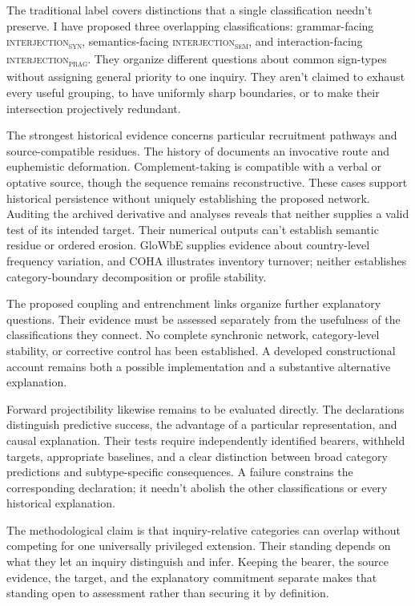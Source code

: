 \documentclass[12pt]{article}
\newcommand{\intj}[1]{\textsc{interjection\textsubscript{#1}}}
\begin{document}
The traditional label  covers distinctions that a single classification needn't preserve. I have proposed three overlapping classifications: grammar-facing \intj{syn}, semantics-facing \intj{sem}, and interaction-facing \intj{prag}. They organize different questions about common sign-types without assigning general priority to one inquiry. They aren't claimed to exhaust every useful grouping, to have uniformly sharp boundaries, or to make their intersection projectively redundant.

The strongest historical evidence concerns particular recruitment pathways and source-compatible residues. The history of  documents an invocative route and euphemistic deformation. Complement-taking  is compatible with a verbal or optative source, though the sequence remains reconstructive. These cases support historical persistence without uniquely establishing the proposed network. Auditing the archived derivative and  analyses reveals that neither supplies a valid test of its intended target. Their numerical outputs can't establish semantic residue or ordered erosion. GloWbE supplies evidence about country-level frequency variation, and COHA illustrates inventory turnover; neither establishes category-boundary decomposition or profile stability.

The proposed coupling and entrenchment links organize further explanatory questions. Their evidence must be assessed separately from the usefulness of the classifications they connect. No complete synchronic network, category-level stability, or corrective control has been established. A developed constructional account remains both a possible implementation and a substantive alternative explanation.

Forward projectibility likewise remains to be evaluated directly. The declarations distinguish predictive success, the advantage of a particular representation, and causal explanation. Their tests require independently identified bearers, withheld targets, appropriate baselines, and a clear distinction between broad category predictions and subtype-specific consequences. A failure constrains the corresponding declaration; it needn't abolish the other classifications or every historical explanation.

The methodological claim is that inquiry-relative categories can overlap without competing for one universally privileged extension. Their standing depends on what they let an inquiry distinguish and infer. Keeping the bearer, the source evidence, the target, and the explanatory commitment separate makes that standing open to assessment rather than securing it by definition.
\end{document}

